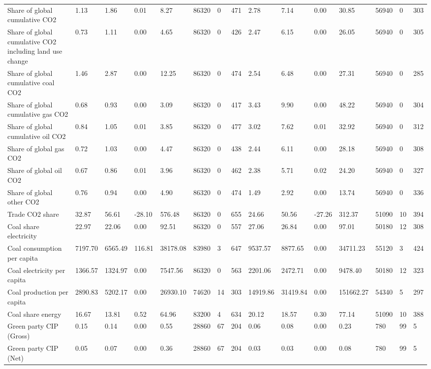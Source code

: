 \begin{longtable}{lllllllllllllll}
\addlinespace
Share of global cumulative CO2 & 1.13 & 1.86 & 0.01 & 8.27 & 86320 & 0 & 471 & 2.78 & 7.14 & 0.00 & 30.85 & 56940 & 0 & 303\\
Share of global cumulative CO2 including land use change & 0.73 & 1.11 & 0.00 & 4.65 & 86320 & 0 & 426 & 2.47 & 6.15 & 0.00 & 26.05 & 56940 & 0 & 305\\
Share of global cumulative coal CO2 & 1.46 & 2.87 & 0.00 & 12.25 & 86320 & 0 & 474 & 2.54 & 6.48 & 0.00 & 27.31 & 56940 & 0 & 285\\
Share of global cumulative gas CO2 & 0.68 & 0.93 & 0.00 & 3.09 & 86320 & 0 & 417 & 3.43 & 9.90 & 0.00 & 48.22 & 56940 & 0 & 304\\
Share of global cumulative oil CO2 & 0.84 & 1.05 & 0.01 & 3.85 & 86320 & 0 & 477 & 3.02 & 7.62 & 0.01 & 32.92 & 56940 & 0 & 312\\
\addlinespace
Share of global gas CO2 & 0.72 & 1.03 & 0.00 & 4.47 & 86320 & 0 & 438 & 2.44 & 6.11 & 0.00 & 28.18 & 56940 & 0 & 308\\
Share of global oil CO2 & 0.67 & 0.86 & 0.01 & 3.96 & 86320 & 0 & 462 & 2.38 & 5.71 & 0.02 & 24.20 & 56940 & 0 & 327\\
Share of global other CO2 & 0.76 & 0.94 & 0.00 & 4.90 & 86320 & 0 & 474 & 1.49 & 2.92 & 0.00 & 13.74 & 56940 & 0 & 336\\
Trade CO2 share & 32.87 & 56.61 & -28.10 & 576.48 & 86320 & 0 & 655 & 24.66 & 50.56 & -27.26 & 312.37 & 51090 & 10 & 394\\
Coal share electricity & 22.97 & 22.06 & 0.00 & 92.51 & 86320 & 0 & 557 & 27.06 & 26.84 & 0.00 & 97.01 & 50180 & 12 & 308\\
\addlinespace
Coal consumption per capita & 7197.70 & 6565.49 & 116.81 & 38178.08 & 83980 & 3 & 647 & 9537.57 & 8877.65 & 0.00 & 34711.23 & 55120 & 3 & 424\\
Coal electricity per capita & 1366.57 & 1324.97 & 0.00 & 7547.56 & 86320 & 0 & 563 & 2201.06 & 2472.71 & 0.00 & 9478.40 & 50180 & 12 & 323\\
Coal production per capita & 2890.83 & 5202.17 & 0.00 & 26930.10 & 74620 & 14 & 303 & 14919.86 & 31419.84 & 0.00 & 151662.27 & 54340 & 5 & 297\\
Coal share energy & 16.67 & 13.81 & 0.52 & 64.96 & 83200 & 4 & 634 & 20.12 & 18.57 & 0.30 & 77.14 & 51090 & 10 & 388\\
Green party CIP (Gross) & 0.15 & 0.14 & 0.00 & 0.55 & 28860 & 67 & 204 & 0.06 & 0.08 & 0.00 & 0.23 & 780 & 99 & 5\\
\addlinespace
Green party CIP (Net) & 0.05 & 0.07 & 0.00 & 0.36 & 28860 & 67 & 204 & 0.03 & 0.03 & 0.00 & 0.08 & 780 & 99 & 5\\

\end{longtable}
